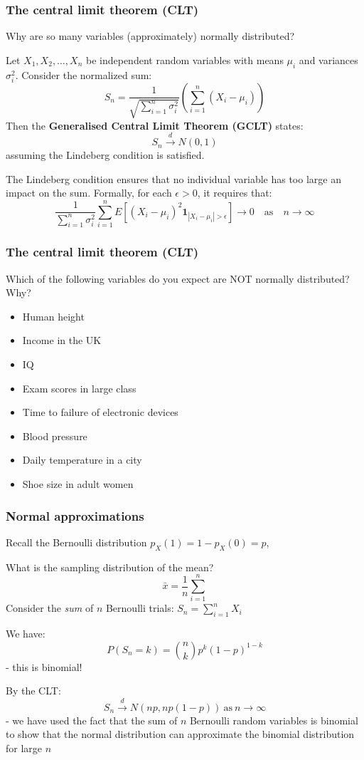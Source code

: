 \documentclass[t,8pt]{beamer}%
\begin{document}
\begin{frame}
	\frametitle{The central limit theorem (CLT)}
	Why are so many variables (approximately) normally distributed? \par 
        Let \( X_1, X_2, \dots, X_n \) be independent random variables with means \( \mu_i \) and variances \( \sigma_i^2 \). Consider the normalized sum:
        \[
        S_n = \frac{1}{\sqrt{\sum_{i=1}^{n} \sigma_i^2}} \left( \sum_{i=1}^{n} (X_i - \mu_i) \right)
        \]
        Then the {\bf Generalised Central Limit Theorem (GCLT)} states:
        \[S_n\xrightarrow{\text{$d$}}N(0,1)\]
        assuming the Lindeberg condition is satisfied. \par
        The Lindeberg condition ensures that no individual variable has too large an impact on the sum. Formally, for each \( \epsilon > 0 \), it requires that:
        \[
        \frac{1}{\sum_{i=1}^{n} \sigma_i^2} \sum_{i=1}^{n} E\left[ (X_i - \mu_i)^2 \mathbf{1}_{|X_i - \mu_i| > \epsilon} \right] \to 0 \quad \text{as} \quad n \to \infty
        \]
\end{frame}

\begin{frame}
    \frametitle{The central limit theorem (CLT)}
    Which of the following variables do you expect are NOT normally distributed? Why?
    \begin{itemize}
        \item Human height
        \item Income in the UK
        \item IQ
        \item Exam scores in large class
        \item Time to failure of electronic devices
        \item Blood pressure
        \item Daily temperature in a city
        \item Shoe size in adult women
    \end{itemize}
\end{frame}

\begin{frame}
	\frametitle{Normal approximations}
	Recall the Bernoulli distribution $p_X(1)=1-p_X(0)=p$, \par
	What is the sampling distribution of the mean?$$\bar x=\frac 1n\sum_{i=1}^n$$
	Consider the {\it sum} of $n$ Bernoulli trials: $S_n=\sum_{i=1}^nX_i$ \par
	We have:
	$$P(S_n=k)={n\choose k} p^k(1-p)^{1-k}$$
	- this is binomial! \par
	By the CLT:
        $$S_n\xrightarrow{\text{$d$}} N(np,np(1-p))\ \text{as}\ n\rightarrow\infty$$
	{\small\color{NavyBlue} - we have used the fact that the sum of $n$ Bernoulli random variables is binomial to show that the normal distribution can approximate the binomial distribution for large $n$}
\end{frame}
\end{document}

